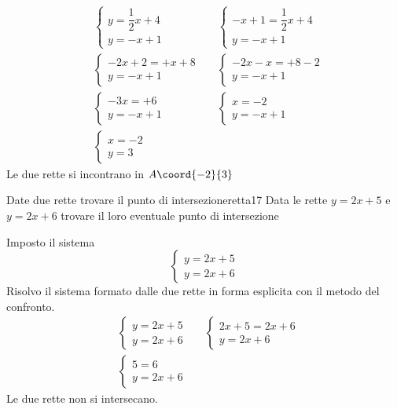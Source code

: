 \begin{align*}
	&\begin{cases} 
		y=\dfrac{1}{2}x+4\\
		y=-x+1
	\end{cases}&&\begin{cases} 
	-x+1=\dfrac{1}{2}x+4\\
	y=-x+1
\end{cases}\\
&\begin{cases} 
	-2x+2=+x+8\\
	y=-x+1
\end{cases}&&\begin{cases} 
-2x-x=+8-2\\
y=-x+1
\end{cases}\\
&\begin{cases} 
	-3x=+6\\
	y=-x+1
\end{cases}&&
\begin{cases} 
	x=-2\\
	y=-x+1
\end{cases}\\
&\begin{cases} 
	x=-2\\
	y=3
\end{cases}
\end{align*}
Le due rette si incontrano in $A\coord{-2}{3}$
\begin{cesempiot}{Date due rette trovare il punto di intersezione}{retta17}
	Data le rette $y=2x+5$ e $y=2x+6$ trovare il loro eventuale punto di intersezione
\end{cesempiot}
Imposto il sistema 
\[\begin{cases} 
y=2x+5\\
y=2x+6
\end{cases}\]
Risolvo il sistema formato dalle due rette in forma esplicita con il metodo del confronto.
\begin{align*}
	&\begin{cases} 
		y=2x+5\\
		y=2x+6
	\end{cases}&&\begin{cases} 
	2x+5=2x+6\\
	y=2x+6
\end{cases}\\
&\begin{cases} 
	5=6\\
	y=2x+6
\end{cases}
\end{align*}
Le due rette non si intersecano.